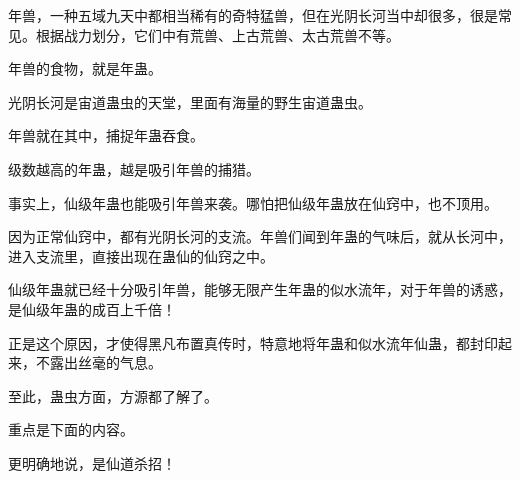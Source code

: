 \begin{this_body}
年兽，一种五域九天中都相当稀有的奇特猛兽，但在光阴长河当中却很多，很是常见。根据战力划分，它们中有荒兽、上古荒兽、太古荒兽不等。

年兽的食物，就是年蛊。

光阴长河是宙道蛊虫的天堂，里面有海量的野生宙道蛊虫。

年兽就在其中，捕捉年蛊吞食。

级数越高的年蛊，越是吸引年兽的捕猎。

事实上，仙级年蛊也能吸引年兽来袭。哪怕把仙级年蛊放在仙窍中，也不顶用。

因为正常仙窍中，都有光阴长河的支流。年兽们闻到年蛊的气味后，就从长河中，进入支流里，直接出现在蛊仙的仙窍之中。

仙级年蛊就已经十分吸引年兽，能够无限产生年蛊的似水流年，对于年兽的诱惑，是仙级年蛊的成百上千倍！

正是这个原因，才使得黑凡布置真传时，特意地将年蛊和似水流年仙蛊，都封印起来，不露出丝毫的气息。

至此，蛊虫方面，方源都了解了。

重点是下面的内容。

更明确地说，是仙道杀招！

\end{this_body}

